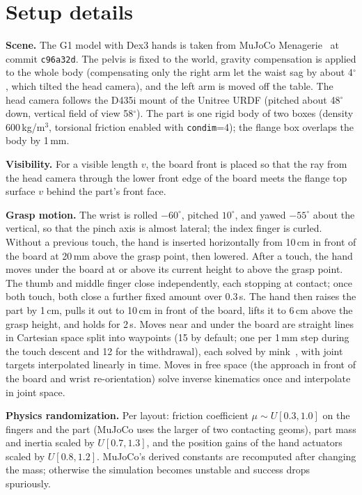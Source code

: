 
\section{Setup details}\label{app:setup}

\textbf{Scene.} The G1 model with Dex3 hands is taken from MuJoCo Menagerie~\cite{menagerie2022} at commit \texttt{c96a32d}. The pelvis is fixed to the world, gravity compensation is applied to the whole body (compensating only the right arm let the waist sag by about 4$^\circ$, which tilted the head camera), and the left arm is moved off the table. The head camera follows the D435i mount of the Unitree URDF (pitched about 48$^\circ$ down, vertical field of view 58$^\circ$). The part is one rigid body of two boxes (density 600\,kg/m$^3$, torsional friction enabled with \texttt{condim}=4); the flange box overlaps the body by 1\,mm.

\textbf{Visibility.} For a visible length $v$, the board front is placed so that the ray from the head camera through the lower front edge of the board meets the flange top surface $v$ behind the part's front face.

\textbf{Grasp motion.} The wrist is rolled $-60^\circ$, pitched $10^\circ$, and yawed $-55^\circ$ about the vertical, so that the pinch axis is almost lateral; the index finger is curled. Without a previous touch, the hand is inserted horizontally from 10\,cm in front of the board at 20\,mm above the grasp point, then lowered. After a touch, the hand moves under the board at or above its current height to above the grasp point. The thumb and middle finger close independently, each stopping at contact; once both touch, both close a further fixed amount over 0.3\,s. The hand then raises the part by 1\,cm, pulls it out to 10\,cm in front of the board, lifts it to 6\,cm above the grasp height, and holds for 2\,s. Moves near and under the board are straight lines in Cartesian space split into waypoints (15 by default; one per 1\,mm step during the touch descent and 12 for the withdrawal), each solved by mink~\cite{zakka2024mink}, with joint targets interpolated linearly in time. Moves in free space (the approach in front of the board and wrist re-orientation) solve inverse kinematics once and interpolate in joint space.

\textbf{Physics randomization.} Per layout: friction coefficient $\mu\sim U[0.3,1.0]$ on the fingers and the part (MuJoCo uses the larger of two contacting geoms), part mass and inertia scaled by $U[0.7,1.3]$, and the position gains of the hand actuators scaled by $U[0.8,1.2]$. MuJoCo's derived constants are recomputed after changing the mass; otherwise the simulation becomes unstable and success drops spuriously.

